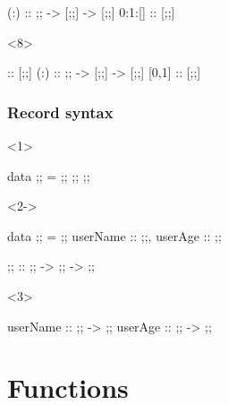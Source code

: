\documentclass[17pt]{beamer}
\renewcommand{\(}[1]{\begin{columns}[#1]}
\renewcommand{\)}{\end{columns}}
\newcommand{\<}[1]{\begin{column}{#1}}
\renewcommand{\>}{\end{column}}
\begin{document}
\begin{frame}[fragile]
\begin{minipage}[t][.3\textheight]{\textwidth}
\begin{center}
\begin{onlyenv}
\begin{code}
                       (:) :: ;; -> [;;] -> [;;]
                    0:1:[] :: [;;]
\end{code}
\end{onlyenv}
\begin{onlyenv}<8>
\begin{code}
                        [] :: [;;]
                       (:) :: ;; -> [;;] -> [;;]
                     [0,1] :: [;;]
\end{code}
\end{onlyenv}
\end{center}
\end{minipage}
\end{frame}

\begin{frame}[fragile]
\frametitle{Record syntax}
\begin{minipage}[t][0.4\textheight]{1.0\linewidth}
\begin{onlyenv}<1>
\begin{code}
          data ;; = ;; ;; ;;
\end{code}
\end{onlyenv}
\begin{onlyenv}<2->
\begin{code}
          data ;; = ;; {
              userName :: ;;,
              userAge  :: ;;
          }
\end{code}
\end{onlyenv}
\end{minipage}
\begin{code}
          ;;     :: ;; -> ;; -> ;;
\end{code}
\begin{uncoverenv}<3>
\begin{code}
          userName :: ;; -> ;;
          userAge  :: ;; -> ;;
\end{code}
\end{uncoverenv}
\end{frame}




\section{Functions}
\end{document}
